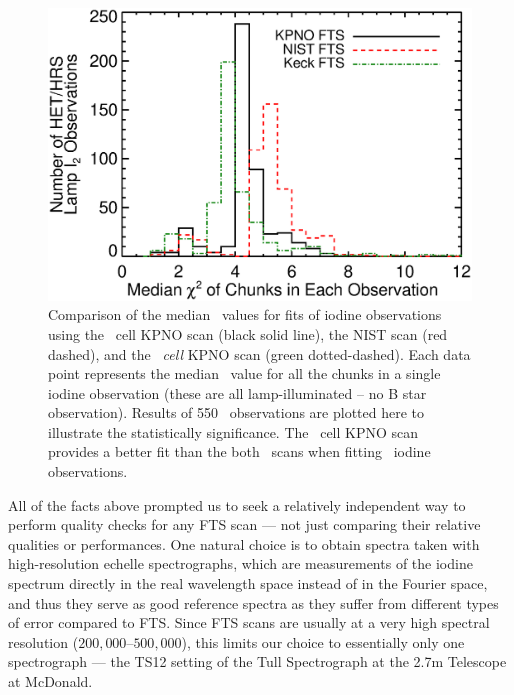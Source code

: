 \begin{figure}[!th]
\centering
\includegraphics[angle=0.,scale=0.38]{het/het_lamp_i2_fits_kpno_nist_keck.eps}
\caption{Comparison of the median \chisq\ values for fits of iodine
  observations using the \het\ cell KPNO scan (black solid line), the
  NIST scan (red dashed), and the {\em \keck\ cell} KPNO scan (green
  dotted-dashed). Each data point represents the median \chisq\ value
  for all the chunks in a single iodine observation (these are all
  lamp-illuminated -- no B star observation). Results of 550
  \het\ observations are plotted here to illustrate the statistically
  significance. The \keck\ cell KPNO scan provides a better fit than the
  both \het\ scans when fitting \het\ iodine observations.
  \label{fig:lampi2fit}}
\end{figure}

All of the facts above prompted us to seek a relatively
independent way to perform quality checks for any FTS scan --- not
just comparing their relative qualities or performances. One
natural choice is to obtain spectra taken with high-resolution echelle
spectrographs, which are measurements of the iodine spectrum directly
in the real wavelength space instead of in the Fourier space, and
thus they serve as good reference spectra as they suffer from
different types of error compared to FTS. Since FTS scans are usually
at a very high spectral resolution ($200,000$--$500,000$), this limits
our choice to essentially only one spectrograph --- the TS12 setting
of the Tull Spectrograph at the 2.7m Telescope at McDonald.


